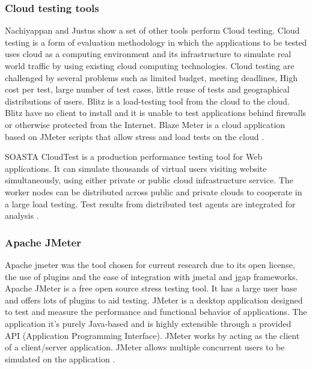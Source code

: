 \documentclass{report}
\begin{document}
\subsubsection{Cloud testing tools}

Nachiyappan and Justus show a set of other tools perform Cloud testing. Cloud testing is a form of evaluation methodology in which the applications to be tested uses cloud as a computing environment and its infrastructure to simulate real world traffic by using existing cloud computing technologies. Cloud testing are challenged by several problems such as limited budget, meeting deadlines, High cost per test, large number of test cases, little reuse of tests and geographical distributions of users.  Blitz is a load-testing tool from the cloud to the cloud. Blitz have no client to install and it is unable to test applications behind firewalls or otherwise protected from the Internet. Blaze Meter is a cloud application based on JMeter scripts that allow stress and load tests on the cloud \cite{Nachiyappan2015}.

SOASTA CloudTest is a production performance testing
tool for Web applications. It can simulate thousands of virtual users visiting website simultaneously, using either private or public cloud infrastructure service. The worker nodes can be distributed across public and private clouds to cooperate in a large load testing. Test results from distributed test agents are
integrated for analysis \cite{Bai2011a}.

\subsubsection{Apache JMeter}

Apache jmeter was the tool chosen for current research due to its open license, the use of plugins and the ease of integration with jmetal and jgap frameworks. Apache JMeter is a free open source stress testing tool.  It has a large user base and offers lots of plugins to aid testing. JMeter is a desktop application designed to test and measure the performance and functional behavior of applications. The application it's purely Java-based and is highly extensible through a provided API (Application Programming Interface). JMeter works by acting as the client of a client/server application. JMeter allows multiple concurrent users to be simulated on the application \cite{Halili2008} \cite{Erinle2013}.
\end{document}
